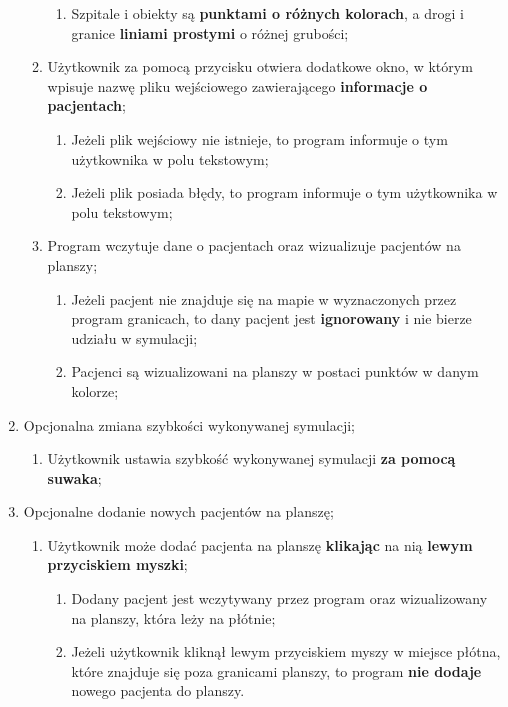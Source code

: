 \documentclass{article}
\begin{document}
\begin{enumerate}[label*=\arabic*.]
\begin{enumerate}[label*=\arabic*.]
\begin{enumerate}[label*=\arabic*.]
                \item Szpitale i obiekty są \textbf{punktami o różnych kolorach}, a drogi i granice \textbf{liniami prostymi} o różnej grubości;
            \end{enumerate}
            \item Użytkownik za pomocą przycisku otwiera dodatkowe okno, w którym wpisuje nazwę pliku wejściowego zawierającego \textbf{informacje o pacjentach};
            \begin{enumerate}[label*=\arabic*.]
                \item Jeżeli plik wejściowy nie istnieje, to program informuje o tym użytkownika w polu tekstowym;
                \item Jeżeli plik posiada błędy, to program informuje o tym użytkownika w polu tekstowym;
            \end{enumerate}
            \item Program wczytuje dane o pacjentach oraz wizualizuje pacjentów na planszy;
            \begin{enumerate}[label*=\arabic*.]
                \item Jeżeli pacjent nie znajduje się na mapie w wyznaczonych przez program granicach, to dany pacjent jest \textbf{ignorowany} i nie bierze udziału w symulacji;
                \item Pacjenci są wizualizowani na planszy w postaci punktów w danym kolorze;
            \end{enumerate}
      \end{enumerate}
      \item Opcjonalna zmiana szybkości wykonywanej symulacji;
        \begin{enumerate}[label*=\arabic*.]
            \item Użytkownik ustawia szybkość wykonywanej symulacji \textbf{za pomocą suwaka};
        \end{enumerate}
      \item Opcjonalne dodanie nowych pacjentów na planszę;
      \begin{enumerate}[label*=\arabic*.]
        \item Użytkownik może dodać pacjenta na planszę \textbf{klikając} na nią \textbf{lewym przyciskiem myszki};
        \begin{enumerate}[label*=\arabic*.]
            \item Dodany pacjent jest wczytywany przez program oraz wizualizowany na planszy, która leży na płótnie;
            \item Jeżeli użytkownik kliknął lewym przyciskiem myszy w miejsce płótna, które znajduje się poza granicami planszy, to program \textbf{nie dodaje} nowego pacjenta do planszy.

\end{enumerate}
\end{enumerate}
\end{enumerate}
\end{document}
